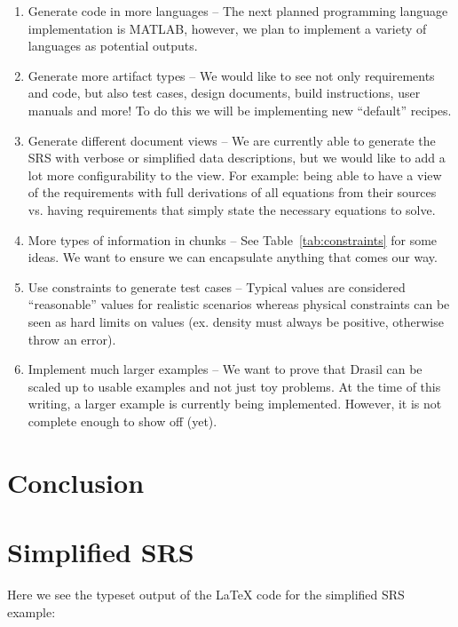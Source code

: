 \documentclass[preprint, 10pt]{sigplanconf}
\begin{document}
\begin{enumerate}
\item Generate code in more languages -- The next planned programming language
implementation is MATLAB, however, we plan to implement a variety of languages
as potential outputs.
\item Generate more artifact types -- We would like to see not only requirements
and code, but also test cases, design documents, build instructions, user
manuals and more! To do this we will be implementing new ``default'' recipes.
\item Generate different document views -- We are currently able to generate the
SRS with verbose or simplified data descriptions, but we would like to add a lot
more configurability to the view. For example: being able to have a view of the
requirements with full derivations of all equations from their sources vs.
having requirements that simply state the necessary equations to solve.
\item More types of information in chunks -- See Table~\ref{tab:constraints} for
some ideas. We want to ensure we can encapsulate anything that comes our way.
\item Use constraints to generate test cases -- Typical values are considered
``reasonable'' values for realistic scenarios whereas physical constraints can
be seen as hard limits on values (ex. density must always be positive, otherwise
throw an error).
\item Implement much larger examples -- We want to prove that Drasil can be
scaled up to usable examples and not just toy problems. At the time of this
writing, a larger example is currently being implemented. However, it is not
complete enough to show off (yet).
\end{enumerate}

\section{Conclusion}
\label{sec:conclusion}

\clearpage
\onecolumn
\appendix
\section{Simplified SRS}
\label{appendix:SRS}
Here we see the typeset output of the LaTeX code for the simplified SRS example:
\end{document}
